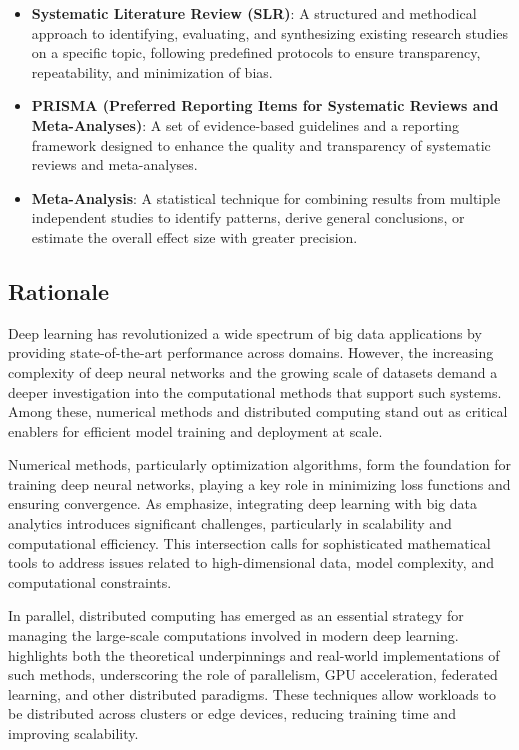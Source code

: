 \documentclass[acmsmall]{acmart}
\begin{document}
\begin{itemize}
    \item \textbf{Systematic Literature Review (SLR)}: A structured and methodical approach to identifying, evaluating, and synthesizing existing research studies on a specific topic, following predefined protocols to ensure transparency, repeatability, and minimization of bias.
    \item \textbf{PRISMA (Preferred Reporting Items for Systematic Reviews and Meta-Analyses)}: A set of evidence-based guidelines and a reporting framework designed to enhance the quality and transparency of systematic reviews and meta-analyses.
    \item \textbf{Meta-Analysis}: A statistical technique for combining results from multiple independent studies to identify patterns, derive general conclusions, or estimate the overall effect size with greater precision.
\end{itemize}

\subsection{Rationale}\label{subsec:rationale}
Deep learning has revolutionized a wide spectrum of big data applications by providing state-of-the-art performance across domains.
However, the increasing complexity of deep neural networks and the growing scale of datasets demand a deeper investigation into
the computational methods that support such systems. Among these, numerical methods and distributed computing stand out as critical
enablers for efficient model training and deployment at scale.

Numerical methods, particularly optimization algorithms, form the foundation for training deep neural networks, playing a key role
in minimizing loss functions and ensuring convergence. As \citet{najafabadi2015deep} emphasize, integrating deep learning with
big data analytics introduces significant challenges, particularly in scalability and computational efficiency.
This intersection calls for sophisticated mathematical tools to address issues related to high-dimensional data, model complexity,
and computational constraints.

In parallel, distributed computing has emerged as an essential strategy for managing the large-scale computations involved in
modern deep learning. \citet{yan2023computational} highlights both the theoretical underpinnings and real-world implementations of such methods,
underscoring the role of parallelism, GPU acceleration, federated learning, and other distributed paradigms.
These techniques allow workloads to be distributed across clusters or edge devices, reducing training time and improving scalability.
\end{document}
